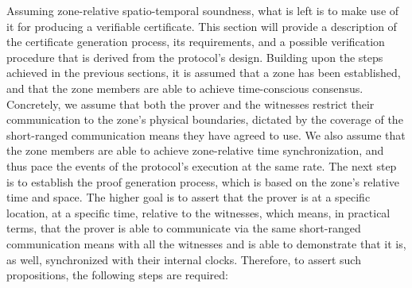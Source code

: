 Assuming zone-relative spatio-temporal soundness, what is left is to make use of it for producing a verifiable \pol{} certificate. This section will provide a description of the \pol{} certificate generation process, its requirements, and a possible verification procedure that is derived from the \pol{} protocol's design. Building upon the steps achieved in the previous sections, it is assumed that a zone has been established, and that the zone members are able to achieve time-conscious consensus. Concretely, we assume that both the prover and the witnesses restrict their communication to the zone's physical boundaries, dictated by the coverage of the short-ranged communication means they have agreed to use. We also assume that the zone members are able to achieve zone-relative time synchronization, and thus pace the events of the protocol's execution at the same rate. The next step is to establish the proof generation process, which is based on the zone's relative time and space. The higher goal is to assert that the prover is at a specific location, at a specific time, relative to the witnesses, which means, in practical terms, that the prover is able to communicate via the same short-ranged communication means with all the witnesses and is able to demonstrate that it is, as well, synchronized with their internal clocks. Therefore, to assert such propositions, the following steps are required:
